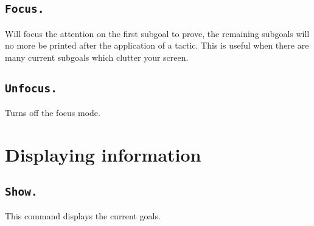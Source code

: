 \begin{ErrMsgs}
\item {}
\end{ErrMsgs}

\subsection{\tt Focus.}
Will focus the attention on the first subgoal to prove, the remaining
subgoals will no more be printed after the application of a tactic.
This is useful when there are many current subgoals which clutter your
screen.

\subsection{\tt Unfocus.}
Turns off the focus mode.


\section{Displaying information}

\subsection{\tt Show.}\label{Show}
This command displays the current goals.

